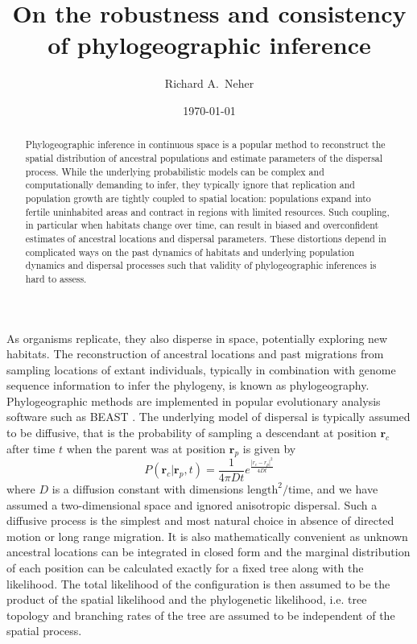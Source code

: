 \documentclass[aps,rmp, twocolumn]{revtex4}
\newcommand{\rvec}{\mathbf{r}}
\begin{document}
\title{On the robustness and consistency of phylogeographic inference}
\author{Richard A.~Neher}
\date{\today}
\begin{abstract}
Phylogeographic inference in continuous space is a popular method to reconstruct the spatial distribution of ancestral populations and estimate parameters of the dispersal process.
While the underlying probabilistic models can be complex and computationally demanding to infer, they typically ignore that replication and population growth are tightly coupled to spatial location: populations expand into fertile uninhabited areas and contract in regions with limited resources.
Such coupling, in particular when habitats change over time, can result in biased and overconfident estimates of ancestral locations and dispersal parameters.
These distortions depend in complicated ways on the past dynamics of habitats and underlying population dynamics and dispersal processes such that validity of phylogeographic inferences is hard to assess.
\end{abstract}

\maketitle
As organisms replicate, they also disperse in space, potentially exploring new habitats.
The reconstruction of ancestral locations and past migrations from sampling locations of extant individuals, typically in combination with genome sequence information to infer the phylogeny, is known as phylogeography.
Phylogeographic methods are implemented in popular evolutionary analysis software such as BEAST \citep{pybus_unifying_2012,lemey_phylogeography_2010}.
The underlying model of dispersal is typically assumed to be diffusive, that is the probability of sampling a descendant at position $\rvec_c$ after time $t$ when the parent was at position $\rvec_p$ is given by
\begin{equation}
    P(\rvec_c| \rvec_p, t) = \frac{1}{4\pi D t}e^{\frac{|r_c - r_p|^2}{4Dt}}
\end{equation}
where $D$ is a diffusion constant with dimensions $\mathrm{length}^2/\mathrm{time}$, and we have assumed a two-dimensional space and ignored anisotropic dispersal.
Such a diffusive process is the simplest and most natural choice in absence of directed motion or long range migration.
It is also mathematically convenient as unknown ancestral locations can be integrated in closed form and the marginal distribution of each position can be calculated exactly for a fixed tree along with the likelihood.
The total likelihood of the configuration is then assumed to be the product of the spatial likelihood and the phylogenetic likelihood, i.e. tree topology and branching rates of the tree are assumed to be independent of the spatial process.
\end{document}
